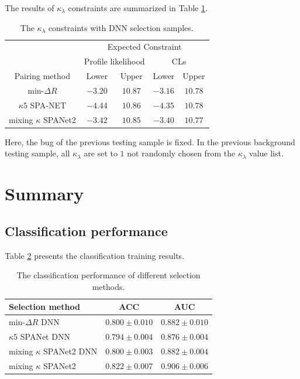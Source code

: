 \documentclass[12pt]{article}
\begin{document}
		The results of $\kappa_\lambda$ constraints are summarized in Table \ref{tab:kappa_constraint_DNN}. 
		\begin{table}[htpb]
			\centering
			\caption{The $\kappa_\lambda$ constraints with DNN selection samples.}
			\label{tab:kappa_constraint_DNN}
			\begin{tabular}{c|cc|cc}
								  & \multicolumn{4}{c}{Expected Constraint}                          \\
								  & \multicolumn{2}{c}{Profile likelihood} & \multicolumn{2}{c}{CLs} \\ \hline
			Pairing method        & Lower              & Upper             & Lower      & Upper      \\ \hline
			$\text{min-}\Delta R$ & $-3.20$            & $10.87$             & $-3.16$      & $10.78$    \\
			$\kappa 5$ SPA-NET    & $-4.44$            & $10.86$             & $-4.35$      & $10.78$   \\
			mixing $\kappa$ SPANet2& $-3.42$           & $10.85$             & $-3.40$      & $10.77$   
			\end{tabular}
		\end{table}

		Here, the bug of the previous testing sample is fixed. In the previous background testing sample, all $\kappa_\lambda$ are set to $1$ not randomly chosen from the $\kappa_\lambda$ value list.
\section{Summary}%
\label{sec:summary}
	\subsection{Classification performance}%
	\label{sub:classification_performance}
		Table \ref{tab:classification_results_summary2} presents the classification training results.
		\begin{table}[htpb]
			\centering
			\caption{The classification performance of different selection methods.}
			\label{tab:classification_results_summary2}
			\begin{tabular}{l|cc}
			Selection method          & ACC   & AUC   \\ \hline
			$\text{min-}\Delta R$ DNN   & $0.800 \pm 0.010$ & $0.882 \pm 0.010$ \\
			$\kappa 5$ SPANet DNN       & $0.794 \pm 0.004$ & $0.876 \pm 0.004$ \\
			mixing $\kappa$ SPANet2 DNN & $0.800 \pm 0.003$ & $0.882 \pm 0.004$ \\
			mixing $\kappa$ SPANet2     & $0.822 \pm 0.007$ & $0.906 \pm 0.006$ 
			\end{tabular}			
		\end{table}
\end{document}

